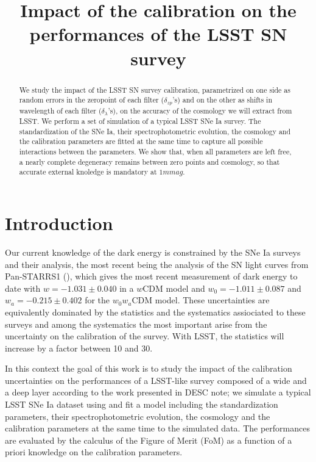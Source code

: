 \documentclass[\docopts]{\docclass}
\begin{document}
\title{ Impact of the calibration on the performances of the LSST SN survey }

\maketitlepre

\begin{abstract}
We study the impact of the LSST SN survey calibration, parametrized on one side as random errors in the zeropoint of each filter ($\delta_{zp}$'s) and on the other as shifts in wavelength of each filter ($\delta_\lambda$'s), on the accuracy of the cosmology we will extract from LSST.
We perform a set of simulation of a typical LSST SNe Ia survey.
The standardization of the SNe Ia, their spectrophotometric evolution, the cosmology and the calibration parameters are fitted at the same time to capture all possible interactions between the parameters.
We show that, when all parameters are left free, a nearly complete degeneracy remains between zero points and cosmology, so that accurate external knoledge is mandatory at $1mmag$.
\end{abstract}


\maketitlepost

% 

\section{Introduction}
\label{sec:intro}

Our current knowledge of the dark energy is constrained by the SNe Ia surveys and their analysis, the most recent being the analysis of the SN light curves from Pan-STARRS1 (\cite{1710.00845}), which gives the most recent measurement of dark energy to date with $w = -1.031 \pm 0.040$ in a $w\text{CDM}$ model and $w_0 = -1.011 \pm 0.087$ and $w_a = -0.215 \pm 0.402$ for the $w_0w_a\text{CDM}$ model. These uncertainties are equivalently dominated by the statistics and the systematics assiociated to these surveys and among the systematics the most important arise from the uncertainty on the calibration of the survey.
With LSST, the statistics will increase by a factor between 10 and 30.

In this context the goal of this work is to study the impact of the calibration uncertainties on the performances of a LSST-like survey composed of a wide and a deep layer according to the work presented in \cite{SN-CADENCE} DESC note; we simulate a typical LSST SNe Ia dataset using  and fit a model including the standardization parameters, their spectrophotometric evolution, the cosmology and the calibration parameters at the same time to the simulated data. The performances are evaluated by the calculus of the Figure of Merit (FoM) as a function of a priori knowledge on the calibration parameters.
\end{document}

